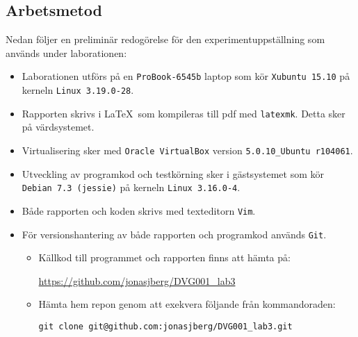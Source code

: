 \subsection{Arbetsmetod}

Nedan följer en preliminär redogörelse för den experimentuppställning som används
under laborationen:

\begin{itemize}
  \item Laborationen utförs på en \texttt{ProBook-6545b} laptop som kör
        \texttt{Xubuntu 15.10} på kerneln \texttt{Linux 3.19.0-28}.

  \item Rapporten skrivs i \LaTeX\  som kompileras till pdf med \texttt{latexmk}.
        Detta sker på värdsystemet.

  \item Virtualisering sker med \texttt{Oracle VirtualBox} version
        \texttt{5.0.10\_Ubuntu r104061}.

  \item Utveckling av programkod och testkörning sker i gästsystemet som kör
        \texttt{Debian 7.3 (jessie)} på kerneln \texttt{Linux 3.16.0-4}.

  \item Både rapporten och koden skrivs med texteditorn \texttt{Vim}.

  \item För versionshantering av både rapporten och programkod används \texttt{Git}.
    \begin{itemize}
      \item Källkod till programmet och rapporten finns att hämta på:

            \url{https://github.com/jonasjberg/DVG001\_lab3}

      \item Hämta hem repon genom att exekvera följande från kommandoraden:
            
            \texttt{git clone git@github.com:jonasjberg/DVG001\_lab3.git}

    \end{itemize}
\end{itemize}


